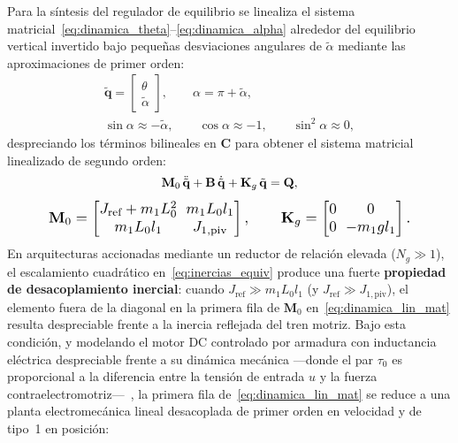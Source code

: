 Para la síntesis del regulador de equilibrio se linealiza el sistema matricial~\eqref{eq:dinamica_theta}--\eqref{eq:dinamica_alpha} alrededor del equilibrio vertical invertido bajo pequeñas desviaciones angulares de $\tilde{\alpha}$ mediante las aproximaciones de primer orden:
\begin{equation}
    \begin{gathered}
        \tilde{\mathbf{q}} = \begin{bmatrix} \theta \\ \tilde{\alpha} \end{bmatrix}, \qquad
        \alpha = \pi + \tilde{\alpha}, \\[3pt]
        \sin\alpha \approx -\tilde{\alpha}, \qquad
        \cos\alpha \approx -1, \qquad
        \sin^2\alpha \approx 0,
    \end{gathered}
    \label{eq:aprox_linealizacion}
\end{equation}
despreciando los términos bilineales en $\mathbf{C}$ para obtener el sistema matricial linealizado de segundo orden:
\begin{equation}
    \begin{gathered}
        \mathbf{M}_0\,\ddot{\tilde{\mathbf{q}}} + \mathbf{B}\,\dot{\tilde{\mathbf{q}}} + \mathbf{K}_g\,\tilde{\mathbf{q}} = \mathbf{Q}, \\[4pt]
        \resizebox{0.85\columnwidth}{!}{$\displaystyle
            \setlength{\arraycolsep}{3pt}
            \mathbf{M}_0 =
            \begin{bmatrix}
                J_{\text{ref}} + m_1 L_0^2 & m_1 L_0 l_1 \\
                m_1 L_0 l_1 & J_{1,\text{piv}}
            \end{bmatrix}, \qquad
            \mathbf{K}_g =
            \begin{bmatrix}
                0 & 0 \\
                0 & -m_1 g l_1
            \end{bmatrix}.
        $}
    \end{gathered}
    \label{eq:dinamica_lin_mat}
\end{equation}
En arquitecturas accionadas mediante un reductor de relación elevada ($N_g \gg 1$), el escalamiento cuadrático en~\eqref{eq:inercias_equiv} produce una fuerte \textbf{propiedad de desacoplamiento inercial}: cuando $J_{\text{ref}} \gg m_1 L_0 l_1$ (y $J_{\text{ref}} \gg J_{1,\text{piv}}$), el elemento fuera de la diagonal en la primera fila de $\mathbf{M}_0$ en~\eqref{eq:dinamica_lin_mat} resulta despreciable frente a la inercia reflejada del tren motriz. Bajo esta condición, y modelando el motor DC controlado por armadura con inductancia eléctrica despreciable frente a su dinámica mecánica ---donde el par $\tau_0$ es proporcional a la diferencia entre la tensión de entrada $u$ y la fuerza contraelectromotriz---~\cite{Ogata2010}, la primera fila de~\eqref{eq:dinamica_lin_mat} se reduce a una planta electromecánica lineal desacoplada de primer orden en velocidad y de tipo~1 en posición:
